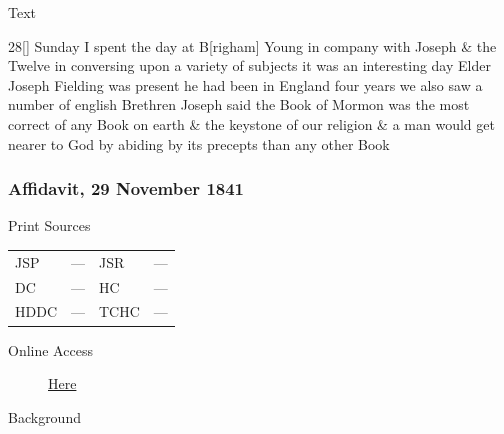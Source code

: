 			\begin{description}
				\item[Text]
			\end{description}
			
				28[] Sunday I spent the day at B[righam] Young in company with Joseph \& the Twelve in conversing upon a variety of subjects it was an interesting day Elder Joseph Fielding was present he had been in England four years we also saw a number of english Brethren Joseph said the Book of Mormon was the most correct of any Book on earth \& the keystone of our religion \& a man would get nearer to God by abiding by its precepts than any other Book
				
		\subsubsection{Affidavit, 29 November 1841}
			\label{EMS-1841-JS-29-NOV-1841}
				
			\begin{description}
				\item[Print Sources]
			\end{description}	

			\begin{tabular}{p{0.5in}p{1in}p{0.5in}p{1in}}
				JSP	 	& ---		& JSR 		& --- \\
				DC	 	& ---		& HC 		& --- \\
				HDDC 	& ---		& TCHC 		& --- \\
			\end{tabular}
			
			\begin{description}
				\item[Online Access] \href{https://www.josephsmithpapers.org/paper-summary/affidavit-29november-1841/1}{Here}
			\end{description}
			
			\begin{description}
				\item[Background]
			\end{description}
			
			

